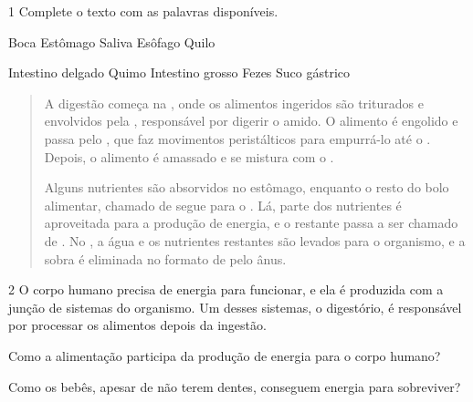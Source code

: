 

\num{1} Complete o texto com as palavras disponíveis.

\begin{mdframed}[linewidth=2pt,linecolor=salmao,backgroundcolor=salmao!20]
Boca \hfill Estômago \hfill Saliva \hfill Esôfago \hfill Quilo \hfill

\noindent{}Intestino delgado \hfill Quimo \hfill Intestino grosso \hfill Fezes \hfill Suco gástrico \hfill
\end{mdframed}

\begin{quote}
A digestão começa na , onde os alimentos ingeridos são triturados e envolvidos pela , responsável por digerir o amido. O alimento é engolido e passa pelo , que faz movimentos peristálticos para empurrá-lo até o . Depois, o alimento é amassado e se mistura com o .

Alguns nutrientes são absorvidos no estômago, enquanto o resto do bolo alimentar, chamado de  segue para o . Lá, parte dos nutrientes é aproveitada para a produção de energia, e o restante passa a ser chamado de . No , a água e os nutrientes restantes são levados para o organismo, e a sobra é eliminada no formato de  pelo ânus.
\end{quote}

\num{2} O corpo humano precisa de energia para funcionar, e ela é
produzida com a junção de sistemas do organismo. Um desses sistemas, o
digestório, é responsável por processar os alimentos depois da ingestão.

\begin{escolha}
\item Como a alimentação participa da produção de energia para o corpo humano?


\item Como os bebês, apesar de não terem dentes, conseguem energia para
sobreviver?

\end{escolha}

